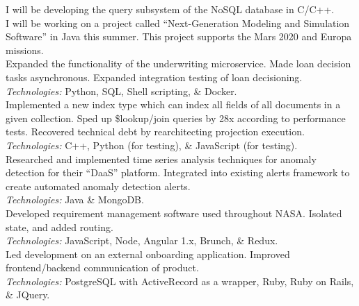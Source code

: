 \documentclass[11pt,letter,sans]{moderncv}
\begin{document}
I will be developing the query subsystem of the NoSQL database in C/C++.
\\
I will be working on a project called ``Next-Generation Modeling and Simulation Software'' in Java this summer. This project supports the Mars 2020 and Europa missions.
\\
Expanded the functionality of the underwriting microservice.
Made loan decision tasks asynchronous.
Expanded integration testing of loan decisioning.
\\
\textit{Technologies:} Python, SQL, Shell scripting, \& Docker.
\\
Implemented a new index type which can index all fields of all documents in a given collection.
Sped up \$lookup/join queries by 28x according to performance tests.
Recovered technical debt by rearchitecting projection execution.
\\
\textit{Technologies:} C++, Python (for testing), \& JavaScript (for testing).
\\
Researched and implemented time series analysis techniques for anomaly detection for their ``DaaS'' platform. Integrated into existing alerts framework to create automated anomaly detection alerts.
\\
\textit{Technologies:} Java \& MongoDB.
\\
Developed requirement management software used throughout NASA.
Isolated state, and added routing.
\\
\textit{Technologies:} JavaScript, Node, Angular 1.x, Brunch, \& Redux.
\\
Led development on an external onboarding application.
Improved frontend/backend communication of product.
\\
\textit{Technologies:} PostgreSQL with ActiveRecord as a wrapper, Ruby, Ruby on Rails, \& JQuery.
\end{document}
